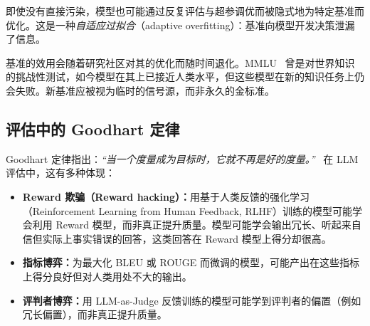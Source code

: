即使没有直接污染，模型也可能通过反复评估与超参调优而被隐式地为特定基准而优化。这是一种\emph{自适应过拟合}（adaptive overfitting）：基准向模型开发决策泄漏了信息。

\begin{warningbox}[基准的生命周期]
基准的效用会随着研究社区对其的优化而随时间退化。MMLU~\cite{hendrycks2021measuring} 曾是对世界知识的挑战性测试，如今模型在其上已接近人类水平，但这些模型在新的知识任务上仍会失败。新基准应被视为临时的信号源，而非永久的金标准。
\end{warningbox}

\subsection{评估中的 Goodhart 定律}
\label{goodharts-law-in-evaluation}

Goodhart 定律指出：\emph{“当一个度量成为目标时，它就不再是好的度量。”}~\cite{goodhart1984problems} 在 LLM 评估中，这有多种体现：

\begin{itemize}
  \item \textbf{Reward 欺骗（Reward hacking）：}用基于人类反馈的强化学习（Reinforcement Learning from Human Feedback, RLHF）训练的模型可能学会利用 Reward 模型，而非真正提升质量。模型可能学会输出冗长、听起来自信但实际上事实错误的回答，这类回答在 Reward 模型上得分却很高。
  \item \textbf{指标博弈：}为最大化 BLEU 或 ROUGE 而微调的模型，可能产出在这些指标上得分良好但对人类用处不大的输出。
  \item \textbf{评判者博弈：}用 LLM-as-Judge 反馈训练的模型可能学到评判者的偏置（例如冗长偏置），而非真正提升质量。
\end{itemize}

